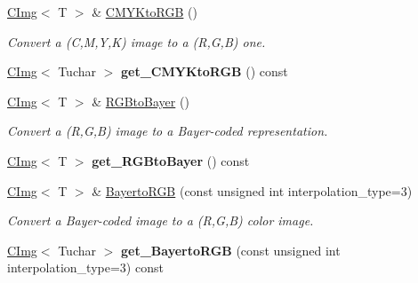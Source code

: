 \begin{DoxyCompactItemize}
\item 
\hypertarget{structcimg__library_1_1CImg_ac59bacaa7b500f54351ebc11a2a4fc1d}{
\hyperlink{structcimg__library_1_1CImg}{CImg}$<$ T $>$ \& \hyperlink{structcimg__library_1_1CImg_ac59bacaa7b500f54351ebc11a2a4fc1d}{CMYKtoRGB} ()}
\label{structcimg__library_1_1CImg_ac59bacaa7b500f54351ebc11a2a4fc1d}

\begin{DoxyCompactList}\small\item\em Convert a (C,M,Y,K) image to a (R,G,B) one. \item\end{DoxyCompactList}\item 
\hypertarget{structcimg__library_1_1CImg_adae9720758275e51ae1cd8d4e21ef5ca}{
\hyperlink{structcimg__library_1_1CImg}{CImg}$<$ Tuchar $>$ {\bfseries get\_\-CMYKtoRGB} () const }
\label{structcimg__library_1_1CImg_adae9720758275e51ae1cd8d4e21ef5ca}

\item 
\hyperlink{structcimg__library_1_1CImg}{CImg}$<$ T $>$ \& \hyperlink{structcimg__library_1_1CImg_ab4e692d67bb005b4b25555693d15f739}{RGBtoBayer} ()
\begin{DoxyCompactList}\small\item\em Convert a (R,G,B) image to a Bayer-\/coded representation. \item\end{DoxyCompactList}\item 
\hypertarget{structcimg__library_1_1CImg_a4810d1052d01825b7c08625690297bfa}{
\hyperlink{structcimg__library_1_1CImg}{CImg}$<$ T $>$ {\bfseries get\_\-RGBtoBayer} () const }
\label{structcimg__library_1_1CImg_a4810d1052d01825b7c08625690297bfa}

\item 
\hypertarget{structcimg__library_1_1CImg_a4d532472a01bafd5a972391870fbdcab}{
\hyperlink{structcimg__library_1_1CImg}{CImg}$<$ T $>$ \& \hyperlink{structcimg__library_1_1CImg_a4d532472a01bafd5a972391870fbdcab}{BayertoRGB} (const unsigned int interpolation\_\-type=3)}
\label{structcimg__library_1_1CImg_a4d532472a01bafd5a972391870fbdcab}

\begin{DoxyCompactList}\small\item\em Convert a Bayer-\/coded image to a (R,G,B) color image. \item\end{DoxyCompactList}\item 
\hypertarget{structcimg__library_1_1CImg_a7ef875be068aedc9d1486959caf1155c}{
\hyperlink{structcimg__library_1_1CImg}{CImg}$<$ Tuchar $>$ {\bfseries get\_\-BayertoRGB} (const unsigned int interpolation\_\-type=3) const }
\label{structcimg__library_1_1CImg_a7ef875be068aedc9d1486959caf1155c}


\end{DoxyCompactItemize}
